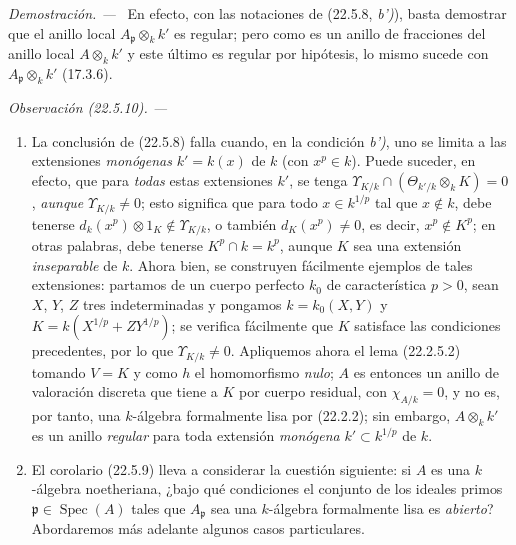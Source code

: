 \documentclass[10pt,oneside]{book}
\makeatletter
\newcommand{\setmanualcurrentlabel}[1]{\def\@currentlabel{#1}}
\newcommand{\oldpage}[2][]{%
  \setcounter{footnote}{0}%
  \marginpar{\scriptsize\textbf{#1}~|~#2}\ignorespaces}
\newenvironment{remark}[1][]{%
  \setmanualcurrentlabel{#1}\par\medskip\noindent\itshape Observación (#1). ---\ }{\par}
\newenvironment{proof}{%
  \par\medskip\noindent\textit{Demostración. ---\ }}{\par}
\makeatother
\begin{document}
\begin{proof}
En efecto, con las notaciones de (22.5.8, \emph{b')}), basta demostrar que
el anillo local $A_{\mathfrak p}\otimes_kk'$ es regular; pero como es un
anillo de fracciones del anillo local $A\otimes_kk'$ y este último es
regular por hipótesis, lo mismo sucede con $A_{\mathfrak p}\otimes_kk'$
(17.3.6).
\end{proof}

\begin{remark}[22.5.10]
\label{0.22.5.10-es}
\begin{enumerate}
  \item[\rm(i)] La conclusión de (22.5.8) falla cuando, en la
  condición \emph{b')}, uno se limita a las extensiones \emph{monógenas} $k'=k(x)$ de $k$
  (con $x^p\in k$). Puede suceder, en efecto, que para \emph{todas} estas extensiones $k'$,
  se tenga
  $\Upsilon_{K/k}\cap(\Theta_{k'/k}\otimes_kK)=0$, \emph{aunque}
  $\Upsilon_{K/k}\neq0$; esto significa que para todo $x\in k^{1/p}$ tal que
  $x\notin k$, debe tenerse
  $d_k(x^p)\otimes1_K\notin\Upsilon_{K/k}$, o también $d_K(x^p)\neq0$,
  es decir, $x^p\notin K^p$; en otras palabras, debe tenerse
  $K^p\cap k=k^p$, aunque $K$ sea una extensión \emph{inseparable} de $k$.
  Ahora bien, se construyen fácilmente ejemplos de tales extensiones: partamos de un
  cuerpo perfecto $k_0$ de característica $p>0$, sean $X$, $Y$, $Z$ tres
  indeterminadas y pongamos $k=k_0(X,Y)$ y
  $K=k(X^{1/p}+ZY^{1/p})$; se verifica fácilmente que $K$ satisface las condiciones
  precedentes, por lo que $\Upsilon_{K/k}\neq0$. Apliquemos ahora el lema
  (22.2.5.2) tomando $V=K$ y como $h$ el homomorfismo \emph{nulo}; $A$ es entonces
  un anillo de valoración discreta que tiene a $K$ por cuerpo residual, con
  $\chi_{A/k}=0$, y no es, por tanto, una $k$-álgebra formalmente lisa por
  (22.2.2); sin embargo, $A\otimes_kk'$ es un anillo \emph{regular} para toda
  extensión \emph{monógena} $k'\subset k^{1/p}$ de $k$.

  \oldpage[0\textsubscript{IV-1}]{205}

  \item[\rm(ii)] El corolario (22.5.9) lleva a considerar la cuestión
  siguiente: si $A$ es una $k$-álgebra noetheriana, ¿bajo qué condiciones
  el conjunto de los ideales primos $\mathfrak p\in\operatorname{Spec}(A)$ tales que
  $A_{\mathfrak p}$ sea una $k$-álgebra formalmente lisa es
  \emph{abierto}? Abordaremos más adelante algunos casos particulares.
\end{enumerate}
\end{remark}
\end{document}
